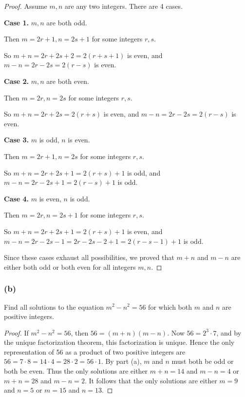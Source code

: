 \documentclass[14pt]{extarticle}
\begin{document}
\begin{proof}
    Assume $m,n$ are any two integers. There are 4 cases.

        {\bf Case 1.} $m,n$ are both odd.

    Then $m = 2r+1, n = 2s+1$ for some integers $r,s$.

    So $m+n = 2r + 2s + 2 = 2(r+s+1)$ is even, and $m-n = 2r - 2s = 2(r-s)$ is even.

        {\bf Case 2.} $m,n$ are both even.

    Then $m = 2r, n = 2s$ for some integers $r,s$.

    So $m+n = 2r + 2s  = 2(r+s)$ is even, and $m-n = 2r - 2s = 2(r-s)$ is even.

        {\bf Case 3.} $m$ is odd, $n$ is even.

    Then $m = 2r+1, n = 2s$ for some integers $r,s$.

    So $m+n = 2r + 2s + 1 = 2(r+s) +1$ is odd, and $m-n = 2r - 2s + 1 = 2(r-s) + 1$ is odd.

        {\bf Case 4.} $m$ is even, $n$ is odd.

    Then $m = 2r, n = 2s+1$ for some integers $r,s$.

    So $m+n = 2r + 2s + 1 = 2(r+s)+1$ is even, and $m-n = 2r - 2s - 1 = 2r - 2s - 2 + 1 = 2(r-s - 1) + 1$ is odd.

    Since these cases exhaust all possibilities, we proved that $m+n$ and $m-n$ are either both odd or both even for all integers $m,n$.
\end{proof}

\subsubsection{(b)}
Find all solutions to the equation $m^2 - n^2 = 56$ for which both $m$ and $n$ are positive integers.

\begin{proof}
    If $m^2 - n^2 = 56$, then $56 = (m + n)(m - n)$. Now $56 = 2^3 \cdot 7$, and by the unique factorization theorem, this factorization is unique. Hence the only representation of 56 as a product of two positive integers are $56 = 7\cdot8 = 14\cdot4 = 28\cdot2 = 56\cdot1$. By part (a), $m$ and $n$ must both be odd or both be even. Thus the only solutions are either $m + n = 14$ and $m - n = 4$ or $m + n = 28$ and $m - n = 2$. It follows that the only solutions are either $m = 9$ and $n = 5$ or $m = 15$ and $n = 13$.
\end{proof}
\end{document}
